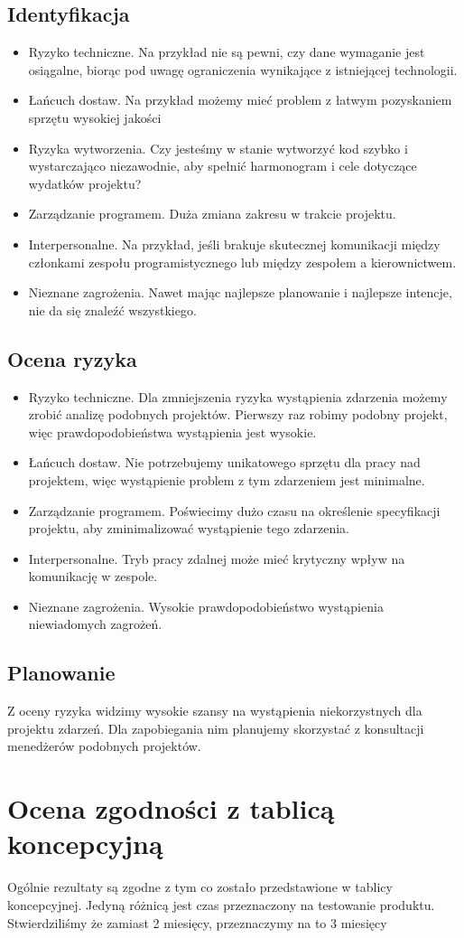 \documentclass[12pt]{article}
\begin{document}
\subsection{Identyfikacja}
\begin{itemize}
	\item Ryzyko techniczne. Na przykład nie są pewni, czy dane wymaganie jest osiągalne, biorąc pod uwagę ograniczenia wynikające z istniejącej technologii.
	\item Łańcuch dostaw. Na przykład możemy mieć problem z łatwym pozyskaniem sprzętu wysokiej jakości
	\item Ryzyka wytworzenia. Czy jesteśmy w stanie wytworzyć kod szybko i wystarczająco niezawodnie, aby spełnić harmonogram i cele dotyczące wydatków projektu?
	\item Zarządzanie programem. Duża zmiana zakresu w trakcie projektu.
	\item Interpersonalne. Na przykład, jeśli brakuje skutecznej komunikacji między członkami zespołu programistycznego lub między zespołem a kierownictwem.
	\item Nieznane zagrożenia. Nawet mając najlepsze planowanie i najlepsze intencje, nie da się znaleźć wszystkiego.
\end{itemize}

\subsection{Ocena ryzyka}
\begin{itemize}
\item Ryzyko techniczne. Dla zmniejszenia ryzyka wystąpienia zdarzenia możemy zrobić analizę podobnych projektów. Pierwszy raz robimy podobny projekt, więc prawdopodobieństwa wystąpienia jest wysokie.
\item Łańcuch dostaw. Nie potrzebujemy unikatowego sprzętu dla pracy nad projektem, więc wystąpienie problem z tym zdarzeniem jest minimalne.
\item Zarządzanie programem. Poświecimy dużo czasu na określenie specyfikacji projektu, aby zminimalizować wystąpienie tego zdarzenia.
\item Interpersonalne. Tryb pracy zdalnej może mieć krytyczny wpływ na komunikację w zespole. 
\item Nieznane zagrożenia. Wysokie prawdopodobieństwo wystąpienia niewiadomych zagrożeń.
\end{itemize}

\subsection{Planowanie}
Z oceny ryzyka widzimy wysokie szansy na wystąpienia niekorzystnych dla projektu zdarzeń. Dla zapobiegania nim planujemy skorzystać z konsultacji menedżerów podobnych projektów. 

\section{Ocena zgodności z tablicą koncepcyjną}
	Ogólnie rezultaty są zgodne z tym co zostało przedstawione w tablicy
	koncepcyjnej. Jedyną różnicą jest czas przeznaczony na testowanie produktu.
	Stwierdziliśmy że zamiast 2 miesięcy, przeznaczymy na to 3 miesięcy
\end{document}
